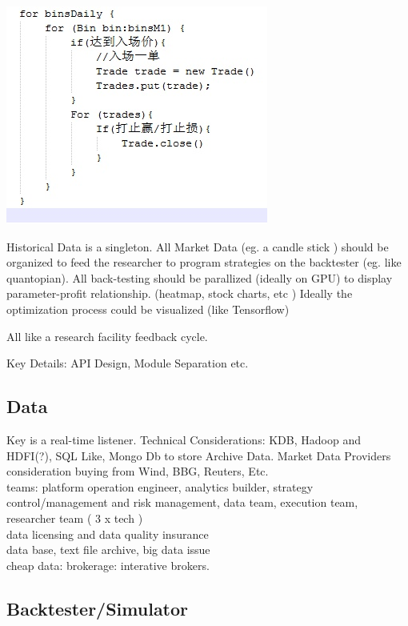 \documentclass[11pt, openany]{book}              %
\begin{document}
\includegraphics[scale=0.5]{6.JPG}


Historical Data is a singleton. All Market Data (eg. a candle stick ) should be organized to feed the researcher to program strategies on the backtester (eg. like quantopian). All back-testing should be parallized (ideally on GPU) to display parameter-profit relationship. (heatmap, stock charts, etc ) Ideally the optimization process could be visualized (like Tensorflow) 

All like a research facility feedback cycle. 

Key Details: API Design, Module Separation etc. 
\subsection{Data}

Key is a real-time listener. Technical Considerations: KDB, Hadoop and HDFI(?), SQL Like, Mongo Db to store Archive Data. Market Data Providers consideration buying from Wind, BBG, Reuters, Etc. \\

teams: platform operation engineer, analytics builder, strategy control/management and risk management, data team, execution team, researcher team ( 3 x tech )\\

data licensing and data quality insurance \\

data base, text file archive, big data issue\\

cheap data: brokerage: interative brokers.

\subsection{Backtester/Simulator}
\end{document}
